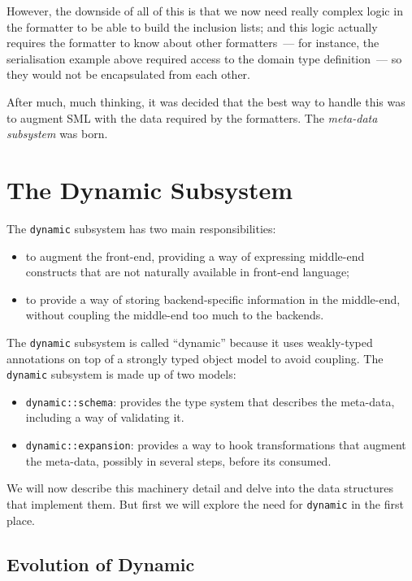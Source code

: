 \documentclass{book}
\begin{document}
However, the downside of all of this is that we now need really
complex logic in the formatter to be able to build the inclusion
lists; and this logic actually requires the formatter to know about
other formatters~--- for instance, the serialisation example above
required access to the domain type definition~--- so they would not be
encapsulated from each other.

After much, much thinking, it was decided that the best way to handle
this was to augment SML with the data required by the formatters. The
\emph{meta-data subsystem} was born.

\chapter{The Dynamic Subsystem}

The \texttt{dynamic} subsystem has two main responsibilities:

\begin{itemize}
\item to augment the front-end, providing a way of expressing
  middle-end constructs that are not naturally available in front-end
  language;
\item to provide a way of storing backend-specific information in the
  middle-end, without coupling the middle-end too much to the
  backends.
\end{itemize}

The \texttt{dynamic} subsystem is called ``dynamic'' because it uses
weakly-typed annotations on top of a strongly typed object model to
avoid coupling. The \texttt{dynamic} subsystem is made up of two
models:

\begin{itemize}
\item \texttt{dynamic::schema}: provides the type system that
  describes the meta-data, including a way of validating it.
\item \texttt{dynamic::expansion}: provides a way to hook
  transformations that augment the meta-data, possibly in several
  steps, before its consumed.
\end{itemize}

We will now describe this machinery detail and delve into the data
structures that implement them. But first we will explore the need for
\texttt{dynamic} in the first place.

\section{Evolution of Dynamic}
\end{document}

